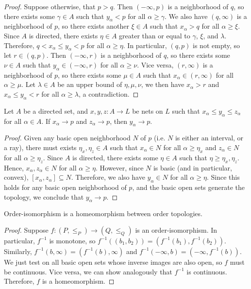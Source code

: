 \documentclass{treatise}
\begin{document}
\begin{proof}
Suppose otherwise, that $p > q$. Then $(-\infty, p)$ is a neighborhood of $q$, so there exists some $\gamma \in A$ such that $y_\alpha < p$ for all $\alpha \geq \gamma$. We also have $(q, \infty)$ is a neighborhood of $p$, so there exists another $\xi \in A$ such that $x_\alpha > q$ for all $\alpha \geq \xi$. Since $A$ is directed, there exists $\eta \in A$ greater than or equal to $\gamma$, $\xi$, and $\lambda$. Therefore, $q < x_\alpha \leq y_\alpha < p$ for all $\alpha \geq \eta$. In particular, $(q, p)$ is not empty, so let $r \in (q, p)$. Then $(-\infty, r)$ is a neighborhood of $q$, so there exists some $\nu \in A$ such that $y_\alpha \in (-\infty, r)$ for all $\alpha \geq \nu$. Vice versa, $(r, \infty)$ is a neighborhood of $p$, so there exists some $\mu \in A$ such that $x_\alpha \in (r, \infty)$ for all $\alpha \geq \mu$. Let $\lambda \in A$ be an upper bound of $\eta, \mu, \nu$, we then have $x_\alpha > r$ and $x_\alpha \leq y_\alpha < r$ for all $\alpha \geq \lambda$, a contradiction.
\end{proof}
\begin{theorem}
Let $A$ be a directed set, and $x, y, z: A \to L$ be nets on $L$ such that $x_\alpha \leq y_\alpha \leq z_\alpha$ for all $\alpha \in A$. If $x_\alpha \to p$ and $z_\alpha \to p$, then $y_\alpha \to p$.
\end{theorem}
\begin{proof}
Given any basic open neighborhood $N$ of $p$ (i.e. $N$ is either an interval, or a ray), there must exists $\eta_x, \eta_z \in A$ such that $x_\alpha \in N$ for all $\alpha \geq \eta_x$ and $z_\alpha \in N$ for all $\alpha \geq \eta_z$. Since $A$ is directed, there exists some $\eta \in A$ such that $\eta \geq \eta_x, \eta_z$. Hence, $x_\alpha, z_\alpha \in N$ for all $\alpha \geq \eta$. However, since $N$ is basic (and in particular, convex), $[x_\alpha, z_\alpha] \subseteq N$. Therefore, we also have $y_\alpha \in N$ for all $\alpha \geq \eta$. Since this holds for any basic open neighborhood of $p$, and the basic open sets generate the topology, we conclude that $y_\alpha \to p$.
\end{proof}
\begin{proposition}
Order-isomorphism is a homeomorphism between order topologies.
\end{proposition}
\begin{proof}
Suppose $f: (P, \leq_P) \to (Q, \leq_Q)$ is an order-isomorphism. In particular, $f^{-1}$ is monotone, so $f^{-1}((b_1, b_2)) = (f^{-1}(b_1), f^{-1}(b_2))$. Similarly, $f^{-1}(b, \infty) = (f^{-1}(b), \infty)$ and $f^{-1}(-\infty, b) = (-\infty, f^{-1}(b))$. We just test on all basic open sets whose inverse images are also open, so $f$ must be continuous. Vice versa, we can show analogously that $f^{-1}$ is continuous. Therefore, $f$ is a homeomorphism.
\end{proof}
\end{document}
